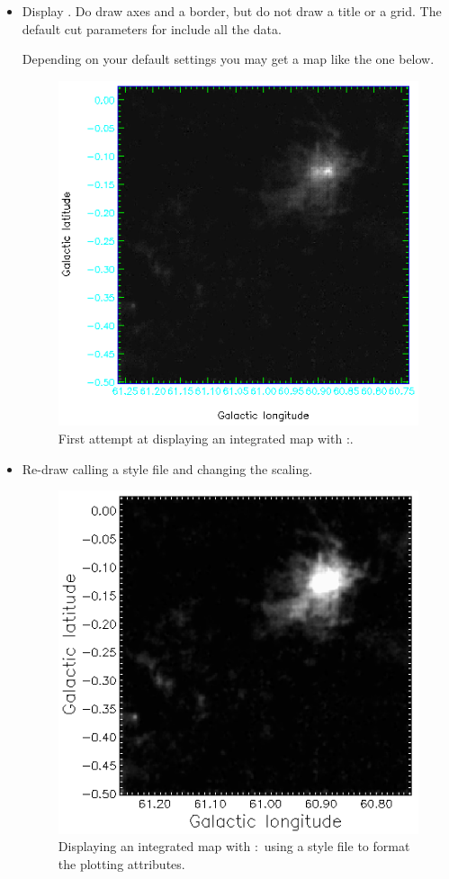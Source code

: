 \documentclass[11pt,oneside,chapters]{starlink}
\begin{document}
\begin{itemize}
\item Display . Do draw axes and a border, but do not draw a
title or a grid. The default cut parameters for 
include all the data.
\begin{terminalv}
\end{terminalv}
Depending on your default settings you may get a map like the one below.

\begin{figure}[h!]
\begin{center}
\includegraphics[width=0.475\linewidth]{sc20_display1}
\caption[First attempt at displaying an integrated map with \Kappa:\display.]{\label{fig:display1}
  First attempt at displaying an integrated map with \Kappa:\display.}
\end{center}
\end{figure}

\item Re-draw calling a style file and changing the scaling.
\begin{terminalv}
\end{terminalv}

\begin{figure}[h!]
\begin{center}
\includegraphics[width=0.475\linewidth]{sc20_display2}
\caption[Displaying an integrated map with \Kappa:\display\ using a style file.]{\label{fig:display2}
  Displaying an integrated map with \Kappa:\display\ using a style file
  to format the plotting attributes.}
\end{center}
\end{figure}


\end{itemize}
\end{document}
